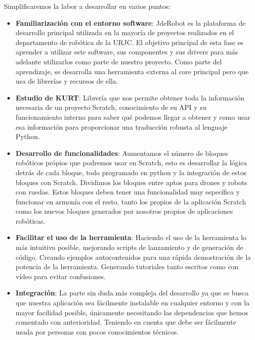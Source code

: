 Simplificaremos la labor a desarrollar en varios puntos:
\begin{itemize}
\item \textbf{Familiarización con el entorno software}: JdeRobot es la plataforma de desarrollo principal utilizada en la mayoría de proyectos realizados en el departamento de robótica
de la URJC. El objetivo principal de esta fase es aprender a utilizar este software, sus
componentes y sus drivers para más adelante utilizarlos como parte de nuestro proyecto.
Como parte del aprendizaje, se desarrolla una herramienta externa al core principal pero que usa de librerías y recursos de ella.
\item \textbf{Estudio de KURT}: Librería que nos permite obtener toda la información necesaria de un proyecto Scratch, conocimiento de su API y su funcionamiento interno para saber qué podemos llegar a obtener y como usar esa información para proporcionar una traducción robusta al lenguaje Python.
\item \textbf{Desarrollo de funcionalidades}: Aumentamos el número de bloques robóticos própios que podremos usar en Scratch, esto es desarrollar la lógica detrás de cada bloque, todo programado en python y la integración de estos bloques con Scratch. Dividimos los bloques entre aptos para drones y robots con ruedas. Estos bloques deben tener una funcionalidad muy específica y funcionar en armonía con el resto, tanto los propios de la aplicación Scratch como los nuevos bloques generados por nosotros propios de aplicaciones robóticas.
\item \textbf{Facilitar el uso de la herramienta}: Haciendo el uso de la herramienta lo más intuitiva posible, mejorando scripts de lanzamiento y de generación de código. Creando ejemplos autocontenidos para una rápida demostración de la potencia de la herramienta. Generando tutoriales tanto escritos como con vídeo para evitar confusiones.
\item \textbf{Integración}: La parte sin duda más compleja del desarrollo ya que se busca que nuestra aplicación sea fácilmente instalable en cualquier entorno y con la mayor facilidad posible, únicamente necesitando las dependencias que hemos comentado con anterioridad. Teniendo en cuenta que debe ser fácilmente usada por personas con pocos conocimientos técnicos.


\end{itemize}
